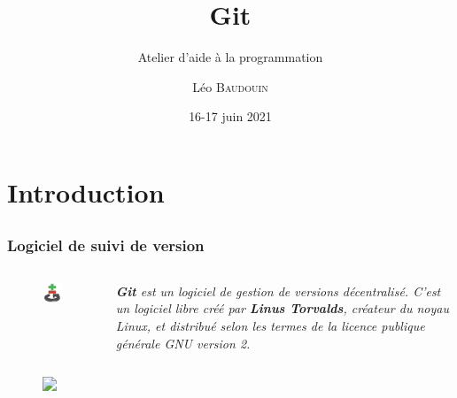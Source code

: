 \documentclass{beamer}
\title{Git}
\subtitle{Atelier d'aide à la programmation}
\author{L\'eo \textsc{Baudouin}}
\institute{
  {\url{baudouin.leo @ gmail.com}}
}
\date{16-17 juin 2021}
\begin{document}
\begin{frame}
  \titlepage
\end{frame}

\section{Introduction}

\subsection{}
\begin{frame}[label=git]
  \frametitle{Logiciel de suivi de version}
  \begin{columns}
    \begin{column}{0.2\linewidth}
      \begin{figure}
	\includegraphics[width=0.95\linewidth]{images/git-logo}  
      \end{figure}
    \end{column}
    \begin{column}{0.8\linewidth}  
      \textit{\textbf{Git} est un logiciel de gestion de versions décentralisé. C'est un logiciel libre créé par \textbf{Linus Torvalds}, créateur du noyau Linux, et distribué selon les termes de la licence publique générale GNU version 2.}
    \end{column}
  \end{columns}
  
  \begin{figure}
    \includegraphics<2>[width=0.95\linewidth]{images/github}  
  \end{figure}
  
\end{frame}
\end{document}
